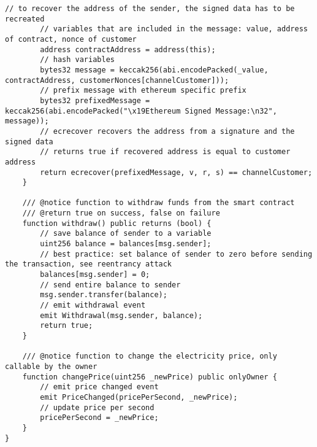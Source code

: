 \begin{lstlisting}[language=Solidity, caption={Payment Channel Smart Contract}, label={lis:pc_sc}]
        // to recover the address of the sender, the signed data has to be recreated
        // variables that are included in the message: value, address of contract, nonce of customer
        address contractAddress = address(this);
        // hash variables
        bytes32 message = keccak256(abi.encodePacked(_value, contractAddress, customerNonces[channelCustomer]));
        // prefix message with ethereum specific prefix
        bytes32 prefixedMessage = keccak256(abi.encodePacked("\x19Ethereum Signed Message:\n32", message));
        // ecrecover recovers the address from a signature and the signed data
        // returns true if recovered address is equal to customer address
        return ecrecover(prefixedMessage, v, r, s) == channelCustomer;
    }

    /// @notice function to withdraw funds from the smart contract
    /// @return true on success, false on failure
    function withdraw() public returns (bool) {
        // save balance of sender to a variable
        uint256 balance = balances[msg.sender];
        // best practice: set balance of sender to zero before sending the transaction, see reentrancy attack
        balances[msg.sender] = 0;
        // send entire balance to sender
        msg.sender.transfer(balance);
        // emit withdrawal event
        emit Withdrawal(msg.sender, balance);
        return true;
    }

    /// @notice function to change the electricity price, only callable by the owner
    function changePrice(uint256 _newPrice) public onlyOwner {
        // emit price changed event
        emit PriceChanged(pricePerSecond, _newPrice);
        // update price per second
        pricePerSecond = _newPrice;
    }
}
\end{lstlisting}
